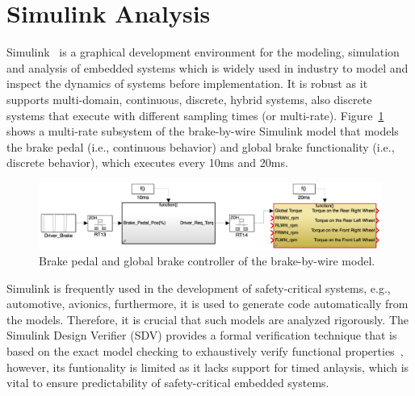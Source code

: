 \section{Simulink Analysis}
Simulink~\cite{JamesB.Dabney2003MasteringSimulink} is a graphical development environment for the modeling, simulation and analysis of embedded systems which is widely used in industry to model and inspect the dynamics of systems before implementation. It is robust as it supports multi-domain, continuous, discrete, hybrid systems, also discrete systems that execute with different sampling times (or multi-rate). Figure~\ref{fig_sm_multi-rate} shows a multi-rate subsystem of the brake-by-wire Simulink model that models the brake pedal (i.e., continuous behavior) and global brake functionality (i.e., discrete behavior), which executes every 10ms and 20ms.  
\begin{figure}[h]
	\centering
	\includegraphics[width=0.9\linewidth]{images/sm}
	\caption{Brake pedal and global brake controller of the brake-by-wire model.}
	\label{fig_sm_multi-rate}
\end{figure}

Simulink is frequently used in the development of safety-critical systems, e.g., automotive, avionics, furthermore, it is used to generate code automatically from the models. Therefore, it is crucial that such models are analyzed rigorously. The Simulink Design Verifier (SDV) provides a formal verification technique that is based on the exact model checking to exhaustively verify functional properties~\cite{MathWokrksSimulinkVerifier}, however, its funtionality is limited as it lacks support for timed anlaysis, which is vital to ensure predictability of safety-critical embedded systems. 

